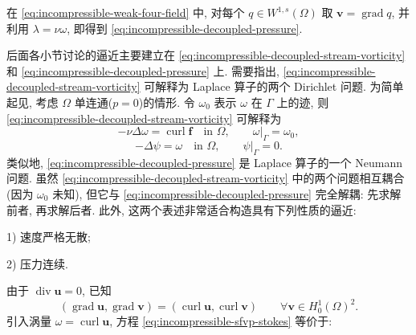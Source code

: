 {\begin{Proof}
在 \eqref{eq:incompressible-weak-four-field} 中,
对每个 $q\in W^{1,s}(\Omega)$ 取
$\mathbf v=\operatorname{grad}q$,
并利用 $\lambda=\nu\omega$, 即得到
\eqref{eq:incompressible-decoupled-pressure}.
\end{Proof}

后面各小节讨论的逼近主要建立在
\eqref{eq:incompressible-decoupled-stream-vorticity}
和 \eqref{eq:incompressible-decoupled-pressure} 上.
需要指出,
\eqref{eq:incompressible-decoupled-stream-vorticity}
可解释为 Laplace 算子的两个 Dirichlet 问题.
为简单起见, 考虑 $\Omega$ 单连通($p=0$)的情形.
令 $\omega_0$ 表示 $\omega$ 在 $\Gamma$ 上的迹,
则 \eqref{eq:incompressible-decoupled-stream-vorticity}
可解释为
\[
-\nu\Delta\omega=\operatorname{curl}\mathbf f
\quad\text{in }\Omega,
\qquad
\omega|_\Gamma=\omega_0,
\]
\[
-\Delta\psi=\omega
\quad\text{in }\Omega,
\qquad
\psi|_\Gamma=0.
\]
类似地,
\eqref{eq:incompressible-decoupled-pressure}
是 Laplace 算子的一个 Neumann 问题.
虽然
\eqref{eq:incompressible-decoupled-stream-vorticity}
中的两个问题相互耦合(因为 $\omega_0$ 未知),
但它与
\eqref{eq:incompressible-decoupled-pressure}
完全解耦: 先求解前者, 再求解后者.
此外, 这两个表述非常适合构造具有下列性质的逼近:

\textup{1)} 速度严格无散;

\textup{2)} 压力连续.
}
由于 $\operatorname{div}\mathbf u=0$, 已知
\begin{equation}\label{eq:incompressible-grad-curl-identity}
(\operatorname{grad}\mathbf u,\operatorname{grad}\mathbf v)
=(\operatorname{curl}\mathbf u,\operatorname{curl}\mathbf v)
\qquad\forall\mathbf v\in H_0^1(\Omega)^2.
\end{equation}
引入涡量 $\omega=\operatorname{curl}\mathbf u$,
方程 \eqref{eq:incompressible-sfvp-stokes} 等价于:

